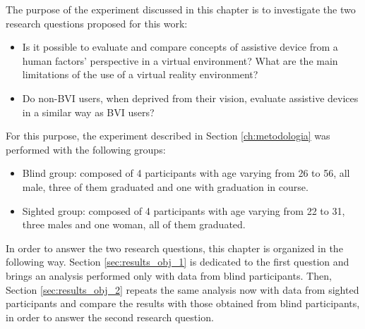 

The purpose of the experiment discussed in this chapter is to investigate the two research questions proposed for this work:

\begin{itemize}%
    \item Is it possible to evaluate and compare concepts of assistive device from a human factors’ perspective in a virtual environment? What are the main limitations of the use of a virtual reality environment?
    \item Do non-BVI users, when deprived from their vision, evaluate assistive devices in a similar way as BVI users?
\end{itemize}

For this purpose, the experiment described in Section \ref{ch:metodologia} was performed with the following groups:

\begin{itemize}
    \item Blind group: composed of 4 participants with age varying from 26 to 56, all male, three of them graduated and one with graduation in course. 

    \item Sighted group: composed of 4 participants with age varying from 22 to 31, three males and one woman, all of them graduated.
\end{itemize}

In order to answer the two research questions, this chapter is organized in the following way. Section \ref{sec:results_obj_1} is dedicated to the first question and brings an analysis performed only with data from blind participants. Then, Section \ref{sec:results_obj_2} repeats the same analysis now with data from sighted participants and compare the results with those obtained from blind participants, in order to answer the second research question.

